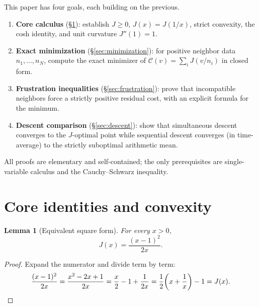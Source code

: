 \documentclass[11pt]{amsart}
\newtheorem{lemma}[theorem]{Lemma}
\theoremstyle{definition}
\theoremstyle{remark}
\begin{document}
\medskip

This paper has four goals, each building on the previous.
\begin{enumerate}[label=(\Roman*),nosep]
\item \textbf{Core calculus} (\S\ref{sec:core}):
  establish $J\ge0$, $J(x)=J(1/x)$, strict convexity, the cosh identity,
  and unit curvature $J''(1)=1$.
\item \textbf{Exact minimization} (\S\ref{sec:minimization}):
  for positive neighbor data $n_1,\dots,n_N$, compute the exact
  minimizer of $\mathcal C(v)=\sum_i J(v/n_i)$ in closed form.
\item \textbf{Frustration inequalities} (\S\ref{sec:frustration}):
  prove that incompatible neighbors force a strictly positive residual
  cost, with an explicit formula for the minimum.
\item \textbf{Descent comparison} (\S\ref{sec:descent}):
  show that simultaneous descent converges to the $J$-optimal point
  while sequential descent converges (in time-average) to the strictly
  suboptimal arithmetic mean.
\end{enumerate}
All proofs are elementary and self-contained; the only prerequisites are
single-variable calculus and the Cauchy--Schwarz inequality.

\section{Core identities and convexity}\label{sec:core}

\begin{lemma}[Equivalent square form]\label{lem:square}
For every $x>0$,
\begin{equation}\label{eq:square}
J(x)=\frac{(x-1)^2}{2x}.
\end{equation}
\end{lemma}
\begin{proof}
Expand the numerator and divide term by term:
\[
\frac{(x-1)^2}{2x}
=\frac{x^2-2x+1}{2x}
=\frac{x}{2}-1+\frac{1}{2x}
=\frac12\!\left(x+\frac1x\right)-1
=J(x).  \qedhere
\]
\end{proof}
\end{document}
